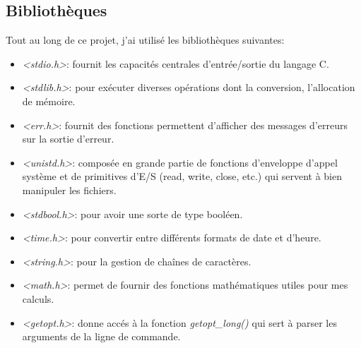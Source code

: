 \documentclass[12pt]{article}
\begin{document}
    \subsection{Bibliothèques}
    Tout au long de ce projet, j'ai utilisé les bibliothèques suivantes:
    \begin{itemize}
		\item \textit{<stdio.h>}: fournit les capacités centrales d'entrée/sortie du langage C.
        \item \textit{<stdlib.h>}: pour exécuter diverses opérations dont la conversion, l'allocation de mémoire.
        \item \textit{<err.h>}: fournit des fonctions permettent d'afficher des messages d'erreurs sur la sortie d'erreur.
        \item \textit{<unistd.h>}: composée en grande partie de fonctions d'enveloppe d'appel système et de primitives d'E/S (read, write, close, etc.) qui servent à bien manipuler les fichiers. 
        \item \textit{<stdbool.h>}: pour avoir une sorte de type booléen.
        \item \textit{<time.h>}: pour convertir entre différents formats de date et d'heure.
        \item \textit{<string.h>}: pour la gestion de chaînes de caractères.
        \item \textit{<math.h>}: permet de fournir des fonctions mathématiques utiles pour mes calculs.
        \item \textit{<getopt.h>}: donne accés à la fonction \textit{getopt\_long()} qui sert à parser les arguments de la ligne de commande. 
	\end{itemize}
\end{document}
